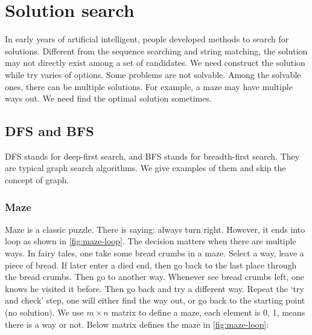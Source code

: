 \documentclass[b5paper]{article}
\begin{document}

\section{Solution search}

In early years of artificial intelligent, people developed methods to search for solutions. Different from the sequence searching and string matching, the solution may not directly exist among a set of candidates. We need construct the solution while try varies of options. Some problems are not solvable. Among the solvable ones, there can be multiple solutions. For example, a maze may have multiple ways out. We need find the optimal solution sometimes.

\subsection{DFS and BFS}
 
\label{sec:DFS-BFS}

DFS stands for deep-first search, and BFS stands for breadth-first search. They are typical graph search algorithms. We give examples of them and skip the concept of graph.

\subsubsection{Maze}
Maze is a classic puzzle. There is saying: always turn right. However, it ends into loop as shown in \cref{fig:maze-loop}. The decision matters when there are multiple ways. In fairy tales, one take some bread crumbs in a maze. Select a way, leave a piece of bread. If later enter a died end, then go back to the last place through the bread crumbs. Then go to another way. Whenever see bread crumbs left, one knows he visited it before. Then go back and try a different way. Repeat the `try and check' step, one will either find the way out, or go back to the starting point (no solution). We use $m \times n$ matrix to define a maze, each element is 0, 1, means there is a way or not. Below matrix defines the maze in \cref{fig:maze-loop}:
\end{document}
